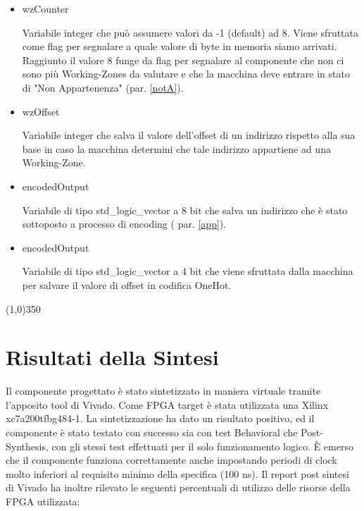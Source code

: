 \documentclass{article}
\newenvironment{gitFont}{\fontfamily{zi4}\selectfont}{\par}
\begin{document}
\begin{flushleft}
\begin{itemize}
\item \begin{gitFont}
wzCounter
\end{gitFont} Variabile integer che  può assumere valori da -1 (default) ad 8. Viene sfruttata come flag per segnalare a quale valore di byte in memoria siamo arrivati. Raggiunto il valore 8 funge da flag per segnalare al componente che non ci sono più Working-Zones da valutare e che la macchina deve entrare in stato di "Non Appartenenza" (par. \ref{notA}).

\item \begin{gitFont}
wzOffset
\end{gitFont} Variabile integer che salva il valore dell'offset di un indirizzo rispetto alla sua base in caso la macchina determini che tale indirizzo appartiene ad una Working-Zone.

\item \begin{gitFont}
encodedOutput
\end{gitFont} Variabile di tipo std{\_}logic{\_}vector a 8 bit che salva un indirizzo che è stato sottoposto a processo di encoding ( par. \ref{app}).

\item \begin{gitFont}
encodedOutput
\end{gitFont} Variabile di tipo std{\_}logic{\_}vector a 4 bit che viene sfruttata dalla macchina per salvare il valore di offset in codifica OneHot.

\end{itemize}

\end{flushleft}

\bigskip




\begin{center}
\line(1,0){350}
\end{center}

\bigskip
\bigskip
\section{Risultati della Sintesi}
Il componente progettato è stato sintetizzato in maniera virtuale tramite l'apposito tool di Vivado. Come FPGA target è stata utilizzata una Xilinx xc7a200tfbg484-1. La sintetizzazione ha dato un risultato positivo, ed il componente è stato testato con successo sia con test Behavioral che Post-Synthesis, con gli stessi test effettuati per il solo funzionamento logico. È emerso che il componente funziona correttamente anche impostando periodi di clock molto inferiori al requisito minimo della specifica (100 ns). Il report post sintesi di Vivado ha inoltre rilevato le seguenti percentuali di utilizzo delle risorse della FPGA utilizzata: 
\bigskip
\end{document}
